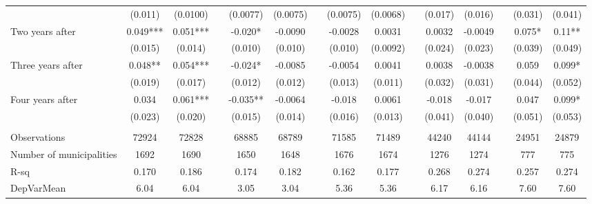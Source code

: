 \begin{tabular}{lcccccccccccccc}
      & (0.011) & (0.0100) &       & (0.0077) & (0.0075) &       & (0.0075) & (0.0068) &       & (0.017) & (0.016) &       & (0.031) & (0.041) \\
Two years after & 0.049*** & 0.051*** &       & -0.020* & -0.0090 &       & -0.0028 & 0.0031 &       & 0.0032 & -0.0049 &       & 0.075* & 0.11** \\
      & (0.015) & (0.014) &       & (0.010) & (0.010) &       & (0.010) & (0.0092) &       & (0.024) & (0.023) &       & (0.039) & (0.049) \\
Three years after & 0.048** & 0.054*** &       & -0.024* & -0.0085 &       & -0.0054 & 0.0041 &       & 0.0038 & -0.0038 &       & 0.059 & 0.099* \\
      & (0.019) & (0.017) &       & (0.012) & (0.012) &       & (0.013) & (0.011) &       & (0.032) & (0.031) &       & (0.044) & (0.052) \\
Four years after & 0.034 & 0.061*** &       & -0.035** & -0.0064 &       & -0.018 & 0.0061 &       & -0.018 & -0.017 &       & 0.047 & 0.099* \\
      & (0.023) & (0.020) &       & (0.015) & (0.014) &       & (0.016) & (0.013) &       & (0.041) & (0.040) &       & (0.051) & (0.053) \\
      &       &       &       &       &       &       &       &       &       &       &       &       &       &  \\
\midrule
Observations & 72924 & 72828 &       & 68885 & 68789 &       & 71585 & 71489 &       & 44240 & 44144 &       & 24951 & 24879 \\
Number of municipalities & 1692  & 1690  &       & 1650  & 1648  &       & 1676  & 1674  &       & 1276  & 1274  &       & 777   & 775 \\
R-sq  & 0.170 & 0.186 &       & 0.174 & 0.182 &       & 0.162 & 0.177 &       & 0.268 & 0.274 &       & 0.257 & 0.274 \\
DepVarMean & 6.04  & 6.04  &       & 3.05  & 3.04  &       & 5.36  & 5.36  &       & 6.17  & 6.16  &       & 7.60  & 7.60 \\
\bottomrule
\bottomrule
\end{tabular}%
